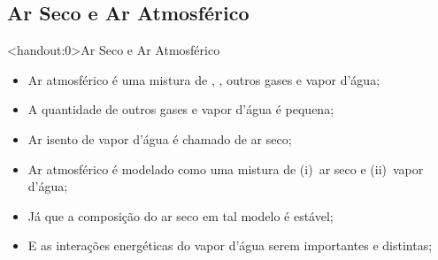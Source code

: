 \subsection{Ar Seco e Ar Atmosférico}

    {
    \begin{frame}<handout:0>{Ar Seco e Ar Atmosférico}\vspace*{-2em}
        \begin{itemize}
            \item<1-> \alert{Ar atmosférico} é uma mistura de , , outros gases e
                \alert{vapor d'água};
            \item<2-> A quantidade de outros gases e vapor d'água é pequena;
            \item<3-> Ar \alert{isento} de vapor d'água é chamado de \alert{ar seco};
            \item<4-> Ar atmosférico é modelado como uma mistura de (i)~\alert{ar seco} e
                (ii)~\alert{vapor d'água};
            \item<5-> Já que a composição do ar seco em tal modelo é estável;
            \item<6-> E as interações \alert{energéticas} do \alert{vapor d'água} serem
                \alert{importantes} e \alert{distintas};
        \end{itemize}
    \end{frame}}
